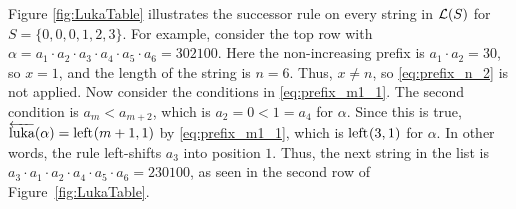 Figure \ref{fig:LukaTable} illustrates the successor rule on every string in $\mathcal{L}(S)$ for $S = \{0,0,0,1,2,3\}$.
For example, consider the top row with $\alpha = a_1 \cdot a_2 \cdot a_3 \cdot a_4 \cdot a_5 \cdot a_6 = 302100$.
Here the non-increasing prefix is $a_1 \cdot a_2 = 30$, so $x = 1$, and the length of the string is $n = 6$.
Thus, $x \neq n$, so \eqref{eq:prefix_n_2} is not applied.
Now consider the conditions in \eqref{eq:prefix_m1_1}.
The second condition is $a_{m} < a_{m+2}$, which is $a_2 = 0 < 1 = a_4$ for $\alpha$.  
Since this is true, $\overleftarrow{\text{luka}}(\alpha) = \operatorname{left}_{}(m+1,1)$ by \eqref{eq:prefix_m1_1}, which is $\operatorname{left}_{}(3,1)$ for $\alpha$.
In other words, the rule left-shifts $a_3$ into position $1$.
Thus, the next string in the list is $a_3 \cdot a_1 \cdot a_2 \cdot a_4 \cdot a_5 \cdot a_6 = 230100$, as seen in the second row of Figure~\ref{fig:LukaTable}.


